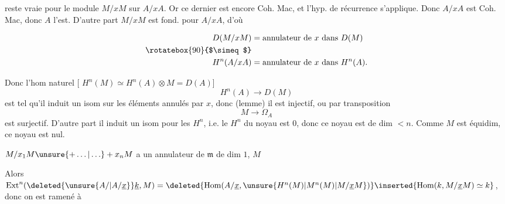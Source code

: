 reste vraie pour le module $M/xM$ sur $A/xA$. Or ce dernier est encore Coh. Mac, et l'hyp. de récurrence s'applique. Donc  $A/xA$ est Coh. Mac, donc $A$ l'est. D'autre part $M/xM$  est fond. pour $A/xA$, d'où

\[
\begin{aligned}
 D(M/xM)&=\text{annulateur de }x\text{ dans }D(M)\\
 \rotatebox{90}{$\simeq$}&\\
 H^{n}(A/xA)&=\text{annulateur de }x\text{ dans }H^n(A).
\end{aligned}
\]

Donc l'hom naturel [ $H^n(M)\simeq H^n(A)\otimes M=D(A)$]
\[
 H^n(A)\longrightarrow D(M)
\]
est tel qu'il induit un isom sur les éléments annulés par $x$, donc (lemme) il est injectif, ou par transposition
\[
 M\to\Omega_A
\]
est surjectif. D'autre part il induit un isom pour les $H^n$, i.e. le $H^n$ du noyau est $0$, donc ce noyau est de dim $<n$. Comme $M$ est équidim, ce noyau est nul.


    $M/x_1M\unsure{+\ldots|\ldots}+x_nM$ a un annulateur de $\mathfrak m$ de dim $1$, $M$  

 Alors  $\operatorname{Ext}^{n}(\deleted{\unsure{A/|A/\underline{x}}}\underline{k},M)=\deleted{\operatorname{Hom}(A/\underline{x},\unsure{H^{n}(M)|M^{n}(M)|M/\underline{x}M})}\inserted{\operatorname{Hom}(k,M/\underline xM)\simeq k}$, donc on est ramené à 

